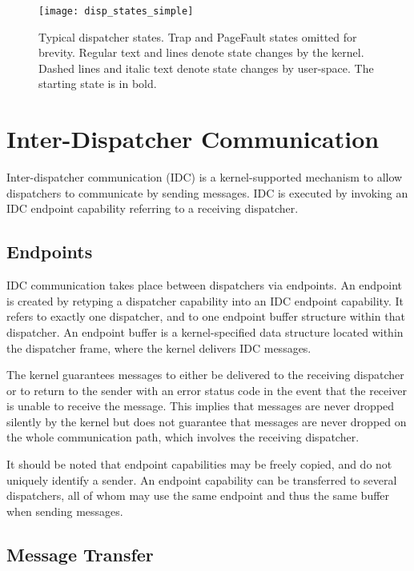 \documentclass[a4paper,11pt,twoside]{report}
\begin{document}
\begin{figure}
\centering
\texttt{[image: disp\_states\_simple]}
\caption[Typical dispatcher states]{Typical dispatcher states.
  Trap and PageFault states
  omitted for brevity. Regular text and lines denote state changes
  by the kernel. Dashed lines and italic text denote state changes
  by user-space. The starting state is in bold.}
\label{fig:dispstates}
\end{figure}

\section{Inter-Dispatcher Communication}\label{sec:IDC}

Inter-dispatcher communication (IDC) is a kernel-supported mechanism
to allow dispatchers to communicate by sending messages. IDC is
executed by invoking an IDC endpoint capability referring to a
receiving dispatcher.

\subsection{Endpoints}

IDC communication takes place between dispatchers via endpoints.
An endpoint is created by retyping a dispatcher capability
into an IDC endpoint capability. It refers to exactly one dispatcher, and
to one endpoint buffer structure within that dispatcher.
An endpoint buffer is a kernel-specified data structure located within the
dispatcher frame, where the kernel delivers IDC messages.

The kernel guarantees messages to either be delivered to the
receiving dispatcher or to return to the sender with an error status
code in the event that the receiver is unable to receive the message.
This implies that messages are never dropped silently by the kernel but does
not guarantee that messages are never dropped on the whole communication path,
which involves the receiving dispatcher.

It should be noted that endpoint capabilities may be freely copied, and do not
uniquely identify a sender. An endpoint capability can be
transferred to several dispatchers, all of whom may use the same
endpoint and thus the same buffer when sending messages.

\subsection{Message Transfer}
\end{document}
